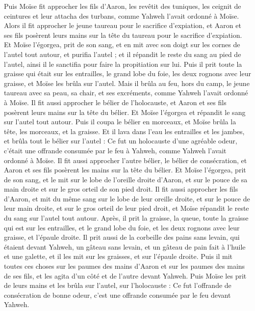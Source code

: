 \begin{multicols}{2}
Puis Moïse fit approcher les fils d'Aaron, les revêtit des tuniques, les ceignit de ceintures et leur attacha des turbans, comme Yahweh l'avait ordonné à Moïse.
Alors il fit approcher le jeune taureau pour le sacrifice d'expiation, et Aaron et ses fils posèrent leurs mains sur la tête du taureau pour le sacrifice d'expiation.
Et Moïse l'égorgea, prit de son sang, et en mit avec son doigt sur les cornes de l'autel tout autour, et purifia l'autel ; et il répandit le reste du sang au pied de l'autel, ainsi il le sanctifia pour faire la propitiation sur lui.
Puis il prit toute la graisse qui était sur les entrailles, le grand lobe du foie, les deux rognons avec leur graisse, et Moïse les brûla sur l'autel.
Mais il brûla au feu, hors du camp, le jeune taureau avec sa peau, sa chair, et ses excréments, comme Yahweh l'avait ordonné à Moïse.
Il fit aussi approcher le bélier de l'holocauste, et Aaron et ses fils posèrent leurs mains sur la tête du bélier.
Et Moïse l'égorgea et répandit le sang sur l'autel tout autour.
Puis il coupa le bélier en morceaux, et Moïse brûla la tête, les morceaux, et la graisse.
Et il lava dans l'eau les entrailles et les jambes, et brûla tout le bélier sur l'autel : Ce fut un holocauste d'une agréable odeur, c'était une offrande consumée par le feu à Yahweh, comme Yahweh l'avait ordonné à Moïse.
Il fit aussi approcher l'autre bélier, le bélier de consécration, et Aaron et ses fils posèrent les mains sur la tête du bélier.
Et Moïse l'égorgea, prit de son sang, et le mit sur le lobe de l'oreille droite d'Aaron, et sur le pouce de sa main droite et sur le gros orteil de son pied droit.
Il fit aussi approcher les fils d'Aaron, et mit du même sang sur le lobe de leur oreille droite, et sur le pouce de leur main droite, et sur le gros orteil de leur pied droit, et Moïse répandit le reste du sang sur l'autel tout autour.
Après, il prit la graisse, la queue, toute la graisse qui est sur les entrailles, et le grand lobe du foie, et les deux rognons avec leur graisse, et l'épaule droite.
Il prit aussi de la corbeille des pains sans levain, qui étaient devant Yahweh, un gâteau sans levain, et un gâteau de pain fait à l'huile et une galette, et il les mit sur les graisses, et sur l'épaule droite.
Puis il mit toutes ces choses sur les paumes des mains d'Aaron et sur les paumes des mains de ses fils, et les agita d'un côté et de l'autre devant Yahweh.
Puis Moïse les prit de leurs mains et les brûla sur l'autel, sur l'holocauste : Ce fut l'offrande de consécration de bonne odeur, c'est une offrande consumée par le feu devant Yahweh.

\end{multicols}
